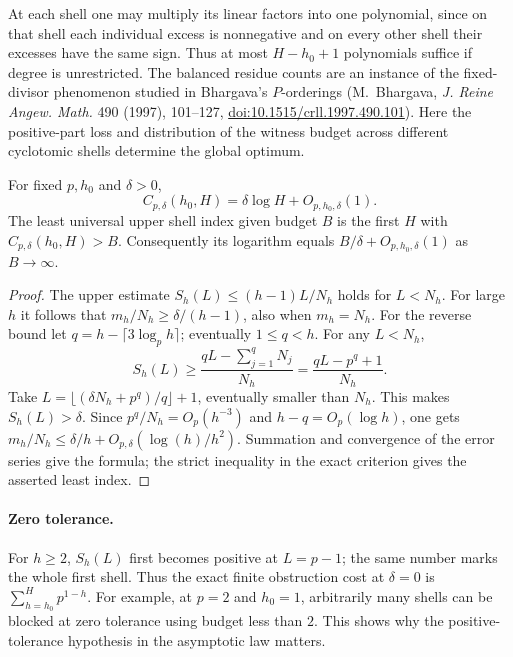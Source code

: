 At each shell one may multiply its linear factors into one polynomial,
since on that shell each individual excess is nonnegative and on every
other shell their excesses have the same sign. Thus at most
$H-h_0+1$ polynomials suffice if degree is unrestricted.
The balanced residue counts are an instance of the fixed-divisor phenomenon
studied in Bhargava's $P$-orderings (M.~Bhargava, \emph{J. Reine Angew.
Math.} 490 (1997), 101--127, \href{https://doi.org/10.1515/crll.1997.490.101}{doi:10.1515/crll.1997.490.101}).
Here the positive-part loss and distribution of the witness budget across
different cyclotomic shells determine the global optimum.

\begin{corollary}\label{cor:exponential-depth}
For fixed $p,h_0$ and $\delta>0$,
\[
 C_{p,\delta}(h_0,H)=\delta\log H+O_{p,h_0,\delta}(1).
\]
The least universal upper shell index given budget $B$ is the first $H$
with $C_{p,\delta}(h_0,H)>B$. Consequently its logarithm equals
$B/\delta+O_{p,h_0,\delta}(1)$ as $B\to\infty$.
\end{corollary}
\begin{proof}
The upper estimate $S_h(L)\le(h-1)L/N_h$ holds for $L<N_h$. For large
$h$ it follows that $m_h/N_h\ge\delta/(h-1)$, also when $m_h=N_h$.
For the reverse bound let $q=h-\lceil 3\log_p h\rceil$; eventually
$1\le q<h$. For any $L<N_h$,
\[
 S_h(L)\ge\frac{qL-\sum_{j=1}^q N_j}{N_h}
          =\frac{qL-p^q+1}{N_h}.
\]
Take $L=\lfloor(\delta N_h+p^q)/q\rfloor+1$, eventually smaller than
$N_h$. This makes $S_h(L)>\delta$. Since $p^q/N_h=O_p(h^{-3})$ and
$h-q=O_p(\log h)$, one gets
$m_h/N_h\le\delta/h+O_{p,\delta}(\log(h)/h^2)$. Summation and convergence
of the error series give the formula; the strict inequality in the exact
criterion gives the asserted least index.
\end{proof}

\paragraph{Zero tolerance.}
For $h\ge2$, $S_h(L)$ first becomes positive at $L=p-1$; the same number
marks the whole first shell. Thus the exact finite obstruction cost at
$\delta=0$ is $\sum_{h=h_0}^{H}p^{1-h}$. For example, at $p=2$ and $h_0=1$,
arbitrarily many shells can be blocked at zero tolerance using budget less
than $2$. This shows why the positive-tolerance hypothesis in the asymptotic
law matters.

